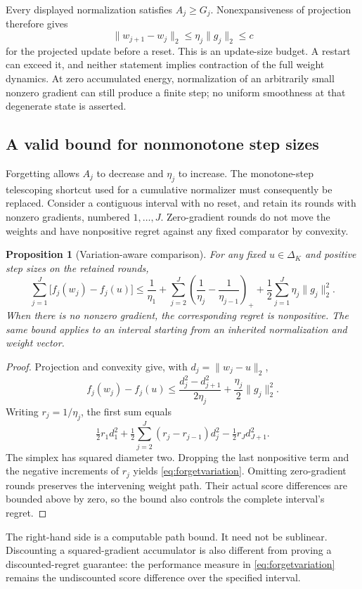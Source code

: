 \documentclass[11pt,a4paper]{article}
\newtheorem{proposition}[theorem]{Proposition}
\theoremstyle{definition}\newtheorem{definition}[theorem]{Definition}
\begin{document}
Every displayed normalization satisfies $A_j\ge G_j$. Nonexpansiveness of projection therefore gives
\begin{equation}
 \|w_{j+1}-w_j\|_2\le\eta_j\|g_j\|_2\le c
 \label{eq:forgetstepbudget}
\end{equation}
for the projected update before a reset. This is an update-size budget. A restart can exceed it, and neither statement implies contraction of the full weight dynamics. At zero accumulated energy, normalization of an arbitrarily small nonzero gradient can still produce a finite step; no uniform smoothness at that degenerate state is asserted.

\subsection{A valid bound for nonmonotone step sizes}
Forgetting allows $A_j$ to decrease and $\eta_j$ to increase. The monotone-step telescoping shortcut used for a cumulative normalizer must consequently be replaced. Consider a contiguous interval with no reset, and retain its rounds with nonzero gradients, numbered $1,\ldots,J$. Zero-gradient rounds do not move the weights and have nonpositive regret against any fixed comparator by convexity.

\begin{proposition}[Variation-aware comparison]\label{prop:forgetbound}
For any fixed $u\in\Delta_K$ and positive step sizes on the retained rounds,
\begin{equation}
 \sum_{j=1}^{J}\bigl[f_j(w_j)-f_j(u)\bigr]
 \le \frac1{\eta_1}
 +\sum_{j=2}^{J}\left(\frac1{\eta_j}-\frac1{\eta_{j-1}}\right)_+
 +\frac12\sum_{j=1}^{J}\eta_j\|g_j\|_2^2.
 \label{eq:forgetvariation}
\end{equation}
When there is no nonzero gradient, the corresponding regret is nonpositive. The same bound applies to an interval starting from an inherited normalization and weight vector.
\end{proposition}
\begin{proof}
Projection and convexity give, with $d_j=\|w_j-u\|_2$,
\[
 f_j(w_j)-f_j(u)\le
 \frac{d_j^2-d_{j+1}^2}{2\eta_j}
       +\frac{\eta_j}{2}\|g_j\|_2^2.
\]
Writing $r_j=1/\eta_j$, the first sum equals
\[
 \tfrac12r_1d_1^2+
 \tfrac12\sum_{j=2}^J(r_j-r_{j-1})d_j^2
 -\tfrac12r_Jd_{J+1}^2.
\]
The simplex has squared diameter two. Dropping the last nonpositive term and the negative increments of $r_j$ yields \eqref{eq:forgetvariation}. Omitting zero-gradient rounds preserves the intervening weight path. Their actual score differences are bounded above by zero, so the bound also controls the complete interval's regret.
\end{proof}
The right-hand side is a computable path bound. It need not be sublinear. Discounting a squared-gradient accumulator is also different from proving a discounted-regret guarantee: the performance measure in \eqref{eq:forgetvariation} remains the undiscounted score difference over the specified interval.
\end{document}
